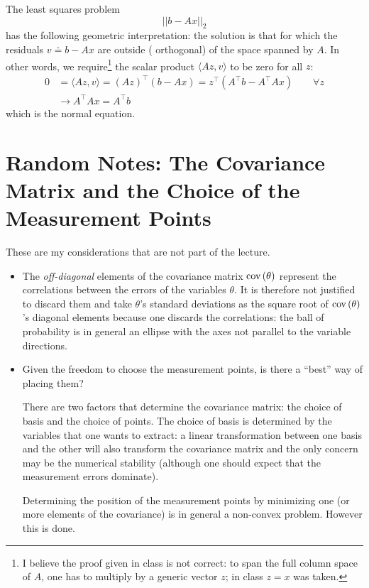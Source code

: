 The least squares problem
\begin{equation*}
  ||b - Ax||_2
\end{equation*}
has the following geometric interpretation: the solution is that for which the residuals $v \doteq b - Ax$ are outside ( orthogonal) of the space spanned by $A$.
In other words, we require\footnote{I believe the proof given in class is not correct: to span the full column space of $A$, one has to multiply by a generic vector $z$; in class $z=x$ was taken.} the scalar product $\langle Az, v\rangle$ to be zero for all $z$:
\begin{align*}
  0 &= \langle Az, v\rangle = (Az)^\top(b-Ax) = z^\top \left(A^\top b - A^\top Ax\right)\hspace{2em}\forall z \\
    &\rightarrow A^\top Ax = A^\top b
\end{align*}
which is the normal equation.


\section{Random Notes: The Covariance Matrix and the Choice of the Measurement Points}
\label{question-covariance}

These are my considerations that are not part of the lecture.

\begin{itemize}
\item The \emph{off-diagonal} elements of the covariance matrix $\textrm{cov}\left(\theta\right)$ represent the correlations between the errors of the variables $\theta$.
It is therefore not justified to discard them and take $\theta$'s standard deviations as the square root of $\textrm{cov}\left(\theta\right)$'s diagonal elements because one discards the correlations: the ball of probability is in general an ellipse with the axes not parallel to the variable directions.

\item Given the freedom to choose the measurement points, is there a ``best'' way of placing them?

  There are two factors that determine the covariance matrix: the choice of basis and the choice of points.
  The choice of basis is determined by the variables that one wants to extract: a linear transformation between one basis and the other will also transform the covariance matrix and the only concern may be the numerical stability (although one should expect that the measurement errors dominate).

  Determining the position of the measurement points by minimizing one (or more elements of the covariance) is in general a non-convex problem. However this is done.
\end{itemize}

